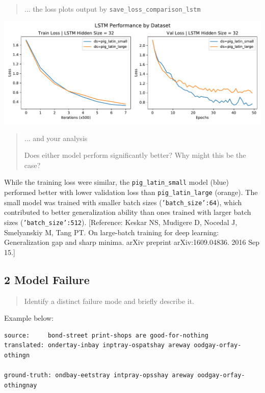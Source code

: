 \documentclass{article}
\begin{document}
\begin{quote}
... the loss plots output by \texttt{save\_loss\_comparison\_lstm}
\end{quote}

\includegraphics[width=\linewidth]{loss_plot_lstm}

\begin{quote}
... and your analysis

Does  either  model perform significantly better?  Why might this be the case?
\end{quote}

While the training loss were similar, the \texttt{pig\_latin\_small} model (blue) performed better with lower validation loss than \texttt{pig\_latin\_large} (orange). The small model was trained with smaller batch sizes (\texttt{'batch\_size':64}), which contributed to better generalization ability than ones trained with larger batch sizes (\texttt{'batch\_size':512}). [Reference: Keskar NS, Mudigere D, Nocedal J, Smelyanskiy M, Tang PT. On large-batch training for deep learning: Generalization gap and sharp minima. arXiv preprint arXiv:1609.04836. 2016 Sep 15.]



\subsection*{2 Model Failure}

\begin{quote}
Identify a distinct failure mode and briefly describe it.
\end{quote}
Example below:

\begin{lstlisting}
source:		bond-street print-shops are good-for-nothing 
translated:	ondertay-inbay inptray-ospatshay areway oodgay-orfay-othingn

ground-truth: ondbay-eetstray intpray-opsshay areway oodgay-orfay-othingnay
\end{lstlisting}
\end{document}
